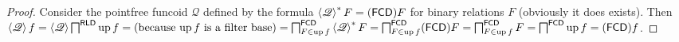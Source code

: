 \begin{proof}
  Consider the pointfree funcoid $\mathscr{Q}$ defined by the formula
  $\left\langle \mathscr{Q} \right\rangle^{\ast} F = (\mathsf{FCD}) F$
  for binary relations $F$ (obviously it does exists). Then $\left\langle
  \mathscr{Q} \right\rangle f = \left\langle \mathscr{Q} \right\rangle
  \bigsqcap^{\mathsf{RLD}} \operatorname{up} f = \text{(because $\operatorname{up} f$
  is a filter base)} = \bigsqcap^{\mathsf{FCD}}_{F \in \operatorname{up} f}
  \left\langle \mathscr{Q} \right\rangle^{\ast} F =
  \bigsqcap^{\mathsf{FCD}}_{F \in \operatorname{up} f} (\mathsf{FCD}) F
  = \bigsqcap^{\mathsf{FCD}}_{F \in \operatorname{up} f} F =
  \bigsqcap^{\mathsf{FCD}} \operatorname{up} f = (\mathsf{FCD}) f$.
\end{proof}
